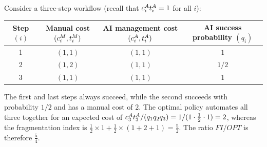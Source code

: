 \documentclass[12pt, final]{article}
\begin{document}
\\[-0.2em]
\noindent{\color{black!25}\rule{\linewidth}{0.4pt}}\par\vspace{1em}
\renewcommand\theexample{OA.B.\arabic{example}}
\setcounter{example}{0}
\begin{example}
\label{ex:FI.tight}
Consider a three-step workflow (recall that $c^{A}_{i}t^{A}_{i} = 1$ for all $i$):
\begin{center}
\begin{tabular}{c|ccc}
\toprule
\makecell{Step\\$(i)$} & \makecell{Manual cost\\$(c^{M}_{i}, t^{M}_{i})$} & \makecell{AI management cost\\$(c^{A}_{i}, t^{A}_{i})$} & \makecell{AI success probability\\$(q_i)$} \\
\midrule
1 & $(1, 1)$ & $(1, 1)$ & $1$ \\
2 & $(1, 2)$ & $(1, 1)$ & $1/2$ \\
3 & $(1, 1)$ & $(1, 1)$ & $1$ \\
\bottomrule
\end{tabular}
\end{center}
The first and last steps always succeed, while the second succeeds with probability $1/2$ and has a manual cost of $2$.
The optimal policy automates all three together for an expected cost of $c^{A}_{3}t^{A}_{3}/(q_1 q_2 q_3) = 1/(1 \cdot \tfrac12 \cdot 1) = 2$, whereas the fragmentation index is $\tfrac12 \times 1 + \tfrac12 \times (1+2+1) = \tfrac52$.
The ratio $FI/OPT$ is therefore $\tfrac54$.
\end{example}
\clearpage
\end{document}

